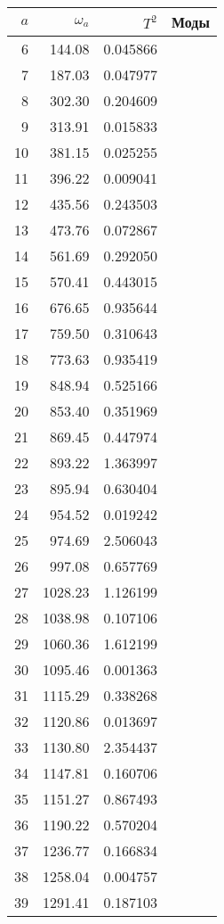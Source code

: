 \tiny
\begin{tabular}{r|rr|l}
  \toprule
  $a$ &  $\omega_a$ & $T^2$ & Моды \\ 
  \midrule
 6 &  144.08  &  0.045866  & \\
 7 &  187.03  &  0.047977  & \\
 8 &  302.30  &  0.204609  & \\
 9 &  313.91  &  0.015833  & \\
10 &  381.15  &  0.025255  & \\
11 &  396.22  &  0.009041  & \\
12 &  435.56  &  0.243503  & \\
13 &  473.76  &  0.072867  & \\
14 &  561.69  &  0.292050  & \\
15 &  570.41  &  0.443015  & \\
16 &  676.65  &  0.935644  & \\
17 &  759.50  &  0.310643  & \\
18 &  773.63  &  0.935419  & \\
19 &  848.94  &  0.525166  & \\
20 &  853.40  &  0.351969  & \\
21 &  869.45  &  0.447974  & \\
22 &  893.22  &  1.363997  & \\
23 &  895.94  &  0.630404  & \\
24 &  954.52  &  0.019242  & \\
25 &  974.69  &  2.506043  & \\
26 &  997.08  &  0.657769  & \\
27 & 1028.23  &  1.126199  & \\
28 & 1038.98  &  0.107106  & \\
29 & 1060.36  &  1.612199  & \\
30 & 1095.46  &  0.001363  & \\
31 & 1115.29  &  0.338268  & \\
32 & 1120.86  &  0.013697  & \\
33 & 1130.80  &  2.354437  & \\
34 & 1147.81  &  0.160706  & \\
35 & 1151.27  &  0.867493  & \\
36 & 1190.22  &  0.570204  & \\
37 & 1236.77  &  0.166834  & \\
38 & 1258.04  &  0.004757  & \\
39 & 1291.41  &  0.187103  & \\

\end{tabular}
